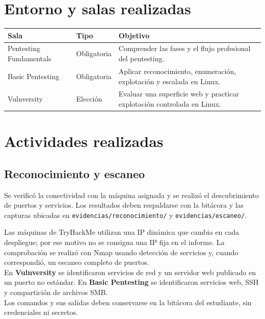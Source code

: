 \documentclass[11pt,a4paper]{article}
\begin{document}
\section{Entorno y salas realizadas}

\begin{center}
\renewcommand{\arraystretch}{1.4}
\begin{tabularx}{\textwidth}{@{}p{4cm}p{3cm}X@{}}
\toprule
\textbf{Sala} & \textbf{Tipo} & \textbf{Objetivo}\\
\midrule
Pentesting Fundamentals & Obligatoria & Comprender las fases y el flujo profesional del pentesting.\\
Basic Pentesting & Obligatoria & Aplicar reconocimiento, enumeración, explotación y escalada en Linux.\\
Vulnversity & Elección & Evaluar una superficie web y practicar explotación controlada en Linux.\\
\bottomrule
\end{tabularx}
\end{center}

\section{Actividades realizadas}

\subsection{Reconocimiento y escaneo}
Se verificó la conectividad con la máquina asignada y se realizó el descubrimiento de puertos y servicios. Los resultados deben respaldarse con la bitácora y las capturas ubicadas en \texttt{evidencias/reconocimiento/} y \texttt{evidencias/escaneo/}.

\begin{campo}
Las máquinas de TryHackMe utilizan una IP dinámica que cambia en cada despliegue; por ese motivo no se consigna una IP fija en el informe. La comprobación se realizó con Nmap usando detección de servicios y, cuando correspondió, un escaneo completo de puertos.\\
En \textbf{Vulnversity} se identificaron servicios de red y un servidor web publicado en un puerto no estándar. En \textbf{Basic Pentesting} se identificaron servicios web, SSH y compartición de archivos SMB.\\
Los comandos y sus salidas deben conservarse en la bitácora del estudiante, sin credenciales ni secretos.
\end{campo}
\end{document}
